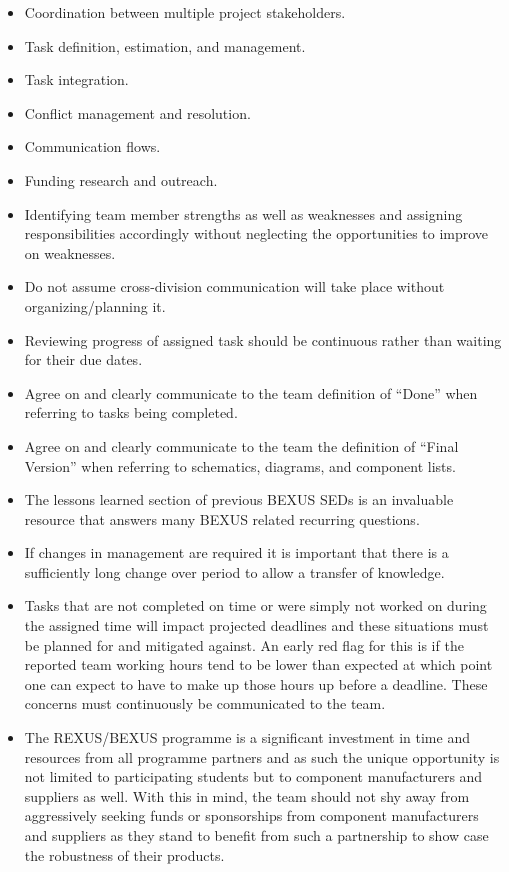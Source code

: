 \documentclass[a4paper,12pt,oneside]{article}
\begin{document}
\begin{itemize}
    \item Coordination between multiple project stakeholders.
    \item Task definition, estimation, and management.
    \item Task integration.
    \item Conflict management and resolution.
    \item Communication flows.
    \item Funding research and outreach.
    \item Identifying team member strengths as well as weaknesses and assigning responsibilities accordingly without neglecting the opportunities to improve on weaknesses. 
    \item Do not assume cross-division communication will take place without organizing/planning it.
    \item Reviewing progress of assigned task should be continuous rather than waiting for their due dates.
    \item Agree on and clearly communicate to the team definition of \enquote{Done} when referring to tasks being completed.
    \item Agree on and clearly communicate to the team the definition of \enquote{Final Version} when referring to schematics, diagrams, and component lists.
    \item The lessons learned section of previous BEXUS SEDs is an invaluable resource that answers many BEXUS related recurring questions.
    \item If changes in management are required it is important that there is a sufficiently long change over period to allow a transfer of knowledge.
    \item Tasks that are not completed on time or were simply not worked on during the assigned time will impact projected deadlines and these situations must be planned for and mitigated against. An early red flag for this is if the reported team working hours tend to be lower than expected at which point one can expect to have to make up those hours up before a deadline. These concerns must continuously be communicated to the team.
    \item The REXUS/BEXUS programme is a significant investment in time and resources from all programme partners and as such the unique opportunity is not limited to participating students but to component manufacturers and suppliers as well. With this in mind, the team should not shy away from aggressively seeking funds or sponsorships from component manufacturers and suppliers as they stand to benefit from such a partnership to show case the robustness of their products.

\end{itemize}
\end{document}
